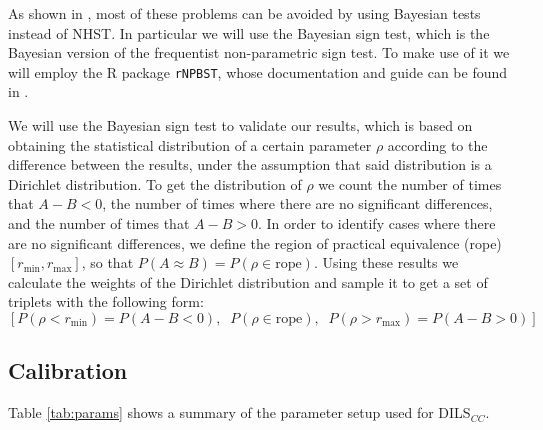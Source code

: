 \documentclass[review]{elsarticle}
\begin{document}
As shown in \cite{benavoli2017time}, most of these problems can be avoided by using Bayesian tests instead of NHST. In particular we will use the Bayesian sign test, which is the Bayesian version of the frequentist non-parametric sign test. To make use of it we will employ the R package \texttt{rNPBST}, whose documentation and guide can be found in \cite{carrasco2017rnpbst}.

We will use the Bayesian sign test to validate our results, which is based on obtaining the statistical distribution of a certain parameter $\rho$ according to the difference between the results, under the assumption that said distribution is a Dirichlet distribution. To get the distribution of $\rho$ we count the number of times that $A - B < 0$, the number of times where there are no significant differences, and the number of times that $A - B > 0$. In order to identify cases where there are no significant differences, we define the region of practical equivalence (rope) $[r_\text{min}, r_\text{max}]$, so that $P(A \approx B) = P(\rho \in \text{rope})$. Using these results we calculate the weights of the Dirichlet distribution and sample it to get a set of triplets with the following form: 
$$[P(\rho < r_\text{min}) = P(A - B < 0),\;\; P(\rho \in \text{rope}),\;\; P(\rho > r_\text{max}) = P(A - B > 0)]$$

\subsection{Calibration}

Table \ref{tab:params} shows a summary of the parameter setup used for DILS$_{CC}$.

\begin{table}[!h]
	\centering
	\setlength{\tabcolsep}{7pt}
	\renewcommand{\arraystretch}{1.4}

	\caption{Parameters setup used for DILS$_{CC}$.}
	\label{tab:params}
\end{table}
\end{document}
